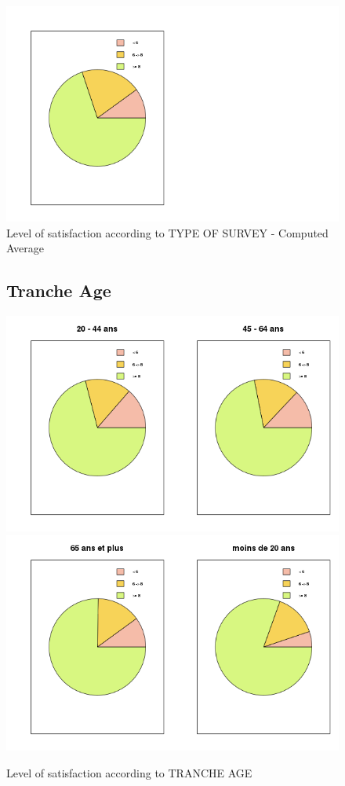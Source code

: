 \documentclass[a4paper, 11pt]{article}
\begin{document}
    
     \begin{figure}[!ht]
    	\centering
             \includegraphics[width = 10 cm]{Remi/Level_of_satisfaction_according_to_TYPE_OF_SURVEY17.png}
             \caption{Level of satisfaction according to TYPE OF SURVEY - Computed Average}
             \label{fig:TYPE_OF_SURVEY17}
     \end{figure}

	\begin{figure}[!ht]
    \subsection{Tranche Age}
    	\centering
            \includegraphics[width = 10 cm]{Remi/Level_of_satisfaction_according_to_TRANCHE_AGE2.png}
            \includegraphics[width = 10 cm]{Remi/Level_of_satisfaction_according_to_TRANCHE_AGE4.png}
            \caption{Level of satisfaction according to TRANCHE AGE}
            \label{fig:TRANCHE_AGE4}
    \end{figure}
\end{document}
